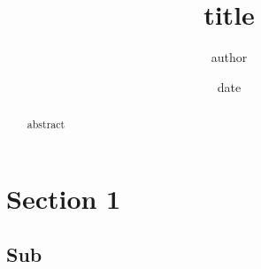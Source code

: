 \documentclass[11pt, a4paper]{article}
\author{author}
\title{title}
\date{date}
\begin{document}
    \maketitle

    \hrulefill

    \begin{abstract}
        abstract
    \end{abstract}

    \hrulefill


    \section{Section 1}

    \subsection*{Sub}
        
    
\end{document}
